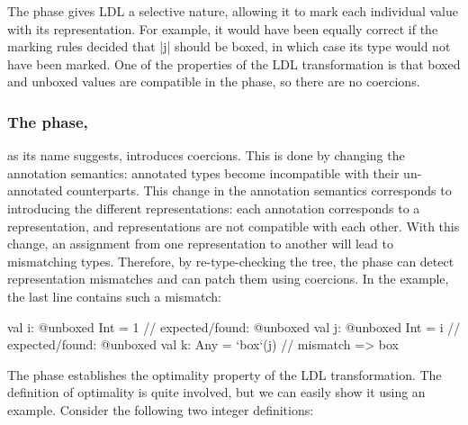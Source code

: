 \vspace{-0.9em}
The \inject{} phase gives LDL a selective nature, allowing it to mark
each individual value with its representation. For example, it would
have been equally correct if the marking rules decided that |j| should
be boxed, in which case its type would not have been marked. One of
the properties of the LDL transformation is that boxed and unboxed
values are compatible in the \inject{} phase, so there are no coercions.

\vspace{-0.3em}
\subsubsection{The \coerce{} phase,} as its name suggests, introduces coercions. This is done by changing the annotation semantics: annotated types become incompatible with their un-annotated counterparts. This change in the annotation semantics corresponds to introducing the different representations: each annotation corresponds to a representation, and representations are not compatible with each other. With this change, an assignment from one representation to another will lead to mismatching types. Therefore, by re-type-checking the tree, the \coerce{} phase can detect representation mismatches and can patch them using coercions. In the example, the last line contains such a mismatch:


\begin{lstlisting-nobreak}
val i: @unboxed Int = 1 // expected/found: @unboxed
val j: @unboxed Int = i // expected/found: @unboxed
val k: Any = `box`(j)             // mismatch => box
\end{lstlisting-nobreak}

The \coerce{} phase establishes the optimality property of the LDL
transformation. The definition of optimality is quite involved,
but we can easily show it using an example.
Consider the following two integer definitions:

